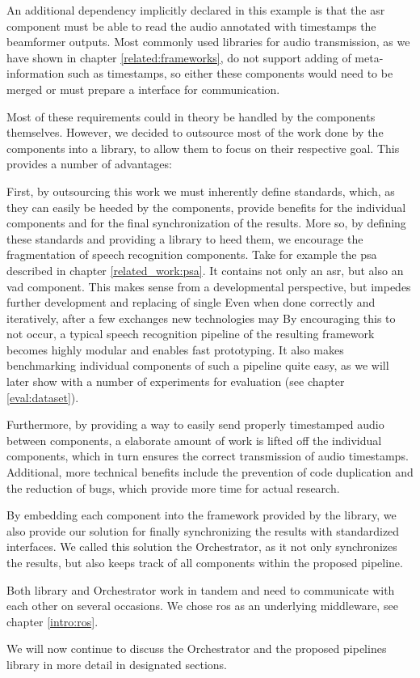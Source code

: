 An additional dependency implicitly declared in this example is that the \gls{asr} component must be able to read the audio annotated with timestamps the beamformer outputs.
Most commonly used libraries for audio transmission, as we have shown in chapter \ref{related:frameworks}, do not support adding of meta-information such as timestamps, so either these components would need to be merged or must prepare a interface for communication.

Most of these requirements could in theory be handled by the components themselves.
However, we decided to outsource most of the work done by the components into a library, to allow them to focus on their respective goal.
This provides a number of advantages:

First, by outsourcing this work we must inherently define standards, which, as they can easily be heeded by the components, provide benefits for the individual components and for the final synchronization of the results.
More so, by defining these standards and providing a library to heed them, we encourage the fragmentation of speech recognition components. 
Take for example the \gls{psa} described in chapter \ref{related_work:psa}.
It contains not only an \gls{asr}, but also an \gls{vad} component.
This makes sense from a developmental perspective, but impedes further development and replacing of single 
Even when done correctly and iteratively, after a few exchanges new technologies may 
By encouraging this to not occur, a typical speech recognition pipeline of the resulting framework becomes highly modular and enables fast prototyping.
It also makes benchmarking individual components of such a pipeline quite easy, as we will later show with a number of experiments for evaluation (see chapter \ref{eval:dataset}).

Furthermore, by providing a way to easily send properly timestamped audio between components, a elaborate amount of work is lifted off the individual components, which in turn ensures the correct transmission of audio timestamps.
Additional, more technical benefits include the prevention of code duplication and the reduction of bugs, which provide more time for actual research.

By embedding each component into the framework provided by the library, we also provide our solution for finally synchronizing the results with standardized interfaces.
We called this solution the Orchestrator, as it not only synchronizes the results, but also keeps track of all components within the proposed pipeline.

Both library and Orchestrator work in tandem and need to communicate with each other on several occasions.
We chose \gls{ros} as an underlying middleware, see chapter \ref{intro:ros}.

We will now continue to discuss the Orchestrator and the proposed pipelines library in more detail in designated sections.



\newpage

%
\newpage
